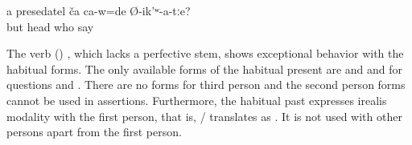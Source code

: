  
\begin{exe}
	
	\ex	\label{ex:Who did you say was the head}
	\gll	a	presedatel	ča 	ca-w=de	Ø-ik'ʷ-a-tːe?\\
		but	head	who		say\\
	\glt	{}
\end{exe}

The verb  () , which lacks a perfective stem, shows exceptional behavior with the habitual forms. The only available forms of the habitual present are   and   and for questions   and  . There are no forms for third person and the second person forms cannot be used in assertions. Furthermore, the habitual past expresses irealis modality with the first person, that is, \slash{} translates as . It is not used with other persons apart from the first person.


